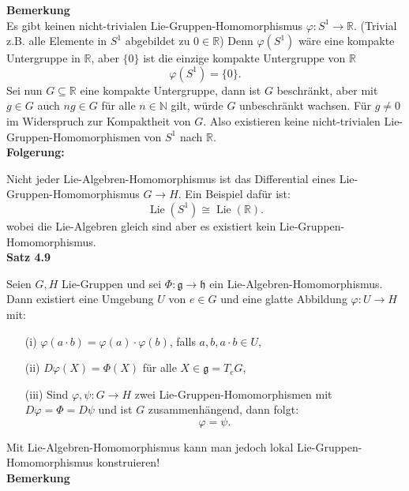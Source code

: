 \documentclass[fleqn, 12pt, letterpaper]{article}
\begin{document}
\textbf{Bemerkung}\\
Es gibt keinen nicht-trivialen Lie-Gruppen-Homomorphismus \( \varphi: S^1 \rightarrow \mathbb{R} \). (Trivial z.B. alle Elemente in $S^1$ abgebildet zu $0\in \mathbb{R}$) Denn \( \varphi(S^1) \) wäre eine kompakte Untergruppe in \( \mathbb{R} \), aber \( \{0\} \) ist die einzige kompakte Untergruppe von \( \mathbb{R} \)
\[
\varphi(S^1) = \{0\}.
\]
Sei nun \( G \subseteq \mathbb{R} \) eine kompakte Untergruppe, dann ist \( G \) beschränkt, aber mit \( g \in G \) auch \( ng \in G \) für alle \( n \in \mathbb{N} \) gilt, würde \( G \) unbeschränkt wachsen. Für $g\neq 0$ im Widerspruch zur Kompaktheit von \( G \). Also existieren keine nicht-trivialen Lie-Gruppen-Homomorphismen von \( S^1 \) nach \( \mathbb{R} \).\\


\textbf{Folgerung:}

Nicht jeder Lie-Algebren-Homomorphismus ist das Differential eines Lie-Gruppen-Homomorphismus \( G \rightarrow H \). Ein Beispiel dafür ist:
\[
\operatorname{Lie}(S^1) \cong \operatorname{Lie}(\mathbb{R}).
\]
wobei die Lie-Algebren gleich sind aber es existiert kein Lie-Gruppen-Homomorphismus.\\

\textbf{Satz 4.9}

Seien \( G, H \) Lie-Gruppen und sei \( \Phi: \mathfrak{g} \rightarrow \mathfrak{h} \) ein Lie-Algebren-Homomorphismus. Dann existiert eine Umgebung \( U \) von \( e \in G \) und eine glatte Abbildung \( \varphi: U \rightarrow H \) mit:
\begin{itemize}
    \item[(i)] \( \varphi(a \cdot b) = \varphi(a) \cdot \varphi(b) \), falls \( a, b, a \cdot b \in U \),
    \item[(ii)] \( D \varphi(X) = \Phi(X) \) für alle \( X \in \mathfrak{g} = T_e G \),
    \item[(iii)] Sind \( \varphi, \psi: G \rightarrow H \) zwei Lie-Gruppen-Homomorphismen mit \( D\varphi = \Phi = D\psi \) und ist \( G \) zusammenhängend, dann folgt:
    \[
    \varphi = \psi.
    \]
\end{itemize}
Mit Lie-Algebren-Homomorphismus kann man jedoch lokal Lie-Gruppen-Homomorphismus konstruieren!\\

\textbf{Bemerkung}
\end{document}

